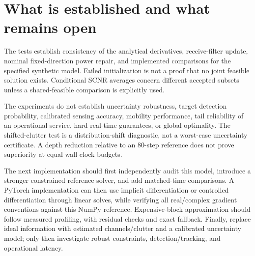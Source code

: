 \documentclass[11pt,a4paper]{article}
\begin{document}


\section{What is established and what remains open}
The tests establish consistency of the analytical derivatives, receive-filter update, nominal fixed-direction power repair, and implemented comparisons for the specified synthetic model. Failed initialization is not a proof that no joint feasible solution exists. Conditional SCNR averages concern different accepted subsets unless a shared-feasible comparison is explicitly used.

The experiments do not establish uncertainty robustness, target detection probability, calibrated sensing accuracy, mobility performance, tail reliability of an operational service, hard real-time guarantees, or global optimality. The shifted-clutter test is a distribution-shift diagnostic, not a worst-case uncertainty certificate. A depth reduction relative to an 80-step reference does not prove superiority at equal wall-clock budgets.

The next implementation should first independently audit this model, introduce a stronger constrained reference solver, and add matched-time comparisons. A PyTorch implementation can then use implicit differentiation or controlled differentiation through linear solves, while verifying all real/complex gradient conventions against this NumPy reference. Expensive-block approximation should follow measured profiling, with residual checks and exact fallback. Finally, replace ideal information with estimated channels/clutter and a calibrated uncertainty model; only then investigate robust constraints, detection/tracking, and operational latency.


\end{document}
